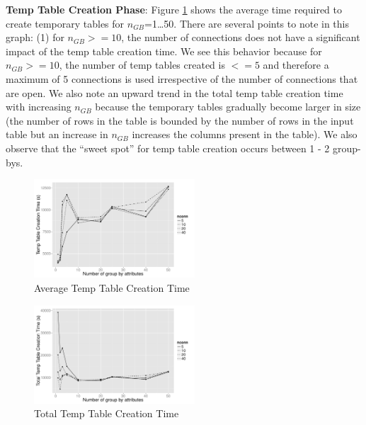 {\bf Temp Table Creation Phase}: Figure \ref{fig:avg_tt_creation} shows the
average time required to create temporary tables for $n_{GB}$=1\ldots50. There
are several points to note in this graph: (1) for $n_{GB}>=10$, the number of
connections does not have a significant impact of the temp table creation time.
We see this behavior because for $n_{GB}>=10$, the number of temp tables created
is $<=5$ and therefore a maximum of 5 connections is used irrespective of the
number of connections that are open.
We also note an upward trend in the total temp table creation time with
increasing $n_{GB}$ because the temporary tables gradually become larger in size
(the number of rows in the table is bounded by the number of rows in the input
table but an increase in $n_{GB}$ increases the columns present in the table).
We also observe that the ``sweet spot'' for temp table creation occurs between 1 -
2 group-bys. 


\begin{figure}[h]
  \centering
    \includegraphics[width=6cm]{Images/mult_gb_tt_creation_single.pdf} 
  \caption{Average Temp Table Creation Time} 
    \label{fig:avg_tt_creation}
\end{figure}

\begin{figure}[h]
  \centering
    \includegraphics[width=6cm]{Images/mult_gb_tt_creation_total.pdf}
  \caption{Total Temp Table Creation Time} 
    \label{fig:total_tt_creation_time}
\end{figure}

